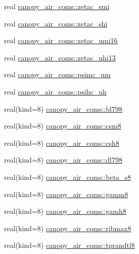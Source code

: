 \begin{DoxyCompactItemize}
\item 
real \hyperlink{namespacecanopy__air__coms_ab653a7e7d40e6ec2598a29d6e9a3a50e}{canopy\+\_\+air\+\_\+coms\+::zetac\+\_\+smi}
\item 
real \hyperlink{namespacecanopy__air__coms_a093aae0805de0a745265adb8868298c8}{canopy\+\_\+air\+\_\+coms\+::zetac\+\_\+shi}
\item 
real \hyperlink{namespacecanopy__air__coms_a764636db2f86a1adc1905d691bde4360}{canopy\+\_\+air\+\_\+coms\+::zetac\+\_\+umi16}
\item 
real \hyperlink{namespacecanopy__air__coms_a74f8e50cf094e01598a35c211c67b723}{canopy\+\_\+air\+\_\+coms\+::zetac\+\_\+uhi13}
\item 
real \hyperlink{namespacecanopy__air__coms_abf26fb907b070d554b4addfe5435bc83}{canopy\+\_\+air\+\_\+coms\+::psimc\+\_\+um}
\item 
real \hyperlink{namespacecanopy__air__coms_a09727ee189e0154ebee372935fe46050}{canopy\+\_\+air\+\_\+coms\+::psihc\+\_\+uh}
\item 
real(kind=8) \hyperlink{namespacecanopy__air__coms_a01333749038884ef7c92a4c7d8cd5624}{canopy\+\_\+air\+\_\+coms\+::bl798}
\item 
real(kind=8) \hyperlink{namespacecanopy__air__coms_ad2e5b49ff61f88df7dc7407537e425ec}{canopy\+\_\+air\+\_\+coms\+::csm8}
\item 
real(kind=8) \hyperlink{namespacecanopy__air__coms_ab97ef4e59d76536ebab6373c5172a42a}{canopy\+\_\+air\+\_\+coms\+::csh8}
\item 
real(kind=8) \hyperlink{namespacecanopy__air__coms_a2189f77c04ada55938a8fa86ae2e646b}{canopy\+\_\+air\+\_\+coms\+::dl798}
\item 
real(kind=8) \hyperlink{namespacecanopy__air__coms_ac5096fb457a6903675b8a7f074324c9b}{canopy\+\_\+air\+\_\+coms\+::beta\+\_\+s8}
\item 
real(kind=8) \hyperlink{namespacecanopy__air__coms_ac396999ab6a5fba728faf7262e98e4a2}{canopy\+\_\+air\+\_\+coms\+::gamm8}
\item 
real(kind=8) \hyperlink{namespacecanopy__air__coms_a613c632cb4cf3fc45475360ceb6209ed}{canopy\+\_\+air\+\_\+coms\+::gamh8}
\item 
real(kind=8) \hyperlink{namespacecanopy__air__coms_a17599291264aab3f8153d5d83afe7d1f}{canopy\+\_\+air\+\_\+coms\+::ribmax8}
\item 
real(kind=8) \hyperlink{namespacecanopy__air__coms_a16694a76d0a909ef9415fbcaee7b9742}{canopy\+\_\+air\+\_\+coms\+::tprandtl8}
\item 

\end{DoxyCompactItemize}
